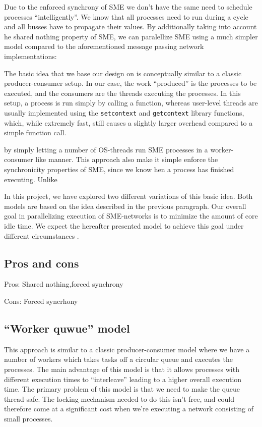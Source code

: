 Due to the enforced synchrony of SME we don't have the same need to
schedule processes ``intelligently''. We know that all processes need
to run during a cycle and all busses have to propagate their
values. By additionally taking into account he shared nothing property
of SME, we can paralellize SME using a much simpler model compared to
the aforementioned message passing network implementations:

The basic idea that we base our design on is conceptually similar to a
classic producer-consumer setup. In our case, the work ``produced'' is
the processes to be executed, and the consumers are the threads
executing the processes. In this setup, a process is run simply by
calling a function, whereas user-level threads are usually implemented
using the \texttt{setcontext} and \texttt{getcontext} library
functions, which, while extremely fast, still causes a slightly larger
overhead compared to a simple function call.

by simply letting a number of OS-threads run SME processes in a
worker-consumer like manner. This approach also make it simple enforce
the synchronicity properties of SME, since we know hen a process has
finished executing. Unlike

In this project, we have explored two different variations of this
basic idea. Both models are based on the idea described in the
previous paragraph. Our overall goal in parallelizing execution of
SME-networks is to minimize the amount of core idle time. We expect
the hereafter presented model to achieve this goal under different
circumstances .



\subsection{Pros and cons}
Pros: Shared nothing,forced synchrony 

Cons: Forced syncrhony 

\subsection{``Worker quwue'' model}
This approach is similar to a classic producer-consumer model where we
have a number of workers which takes tasks off a circular queue and
executes the processes. The main advantage of this model is that it
allows processes with different execution times to ``interleave''
leading to a higher overall execution time. The primary problem of
this model is that we need to make the queue thread-safe. The locking
mechanism needed to do this isn't free, and could therefore come at a
significant cost when we're executing a network consisting of small
processes.

